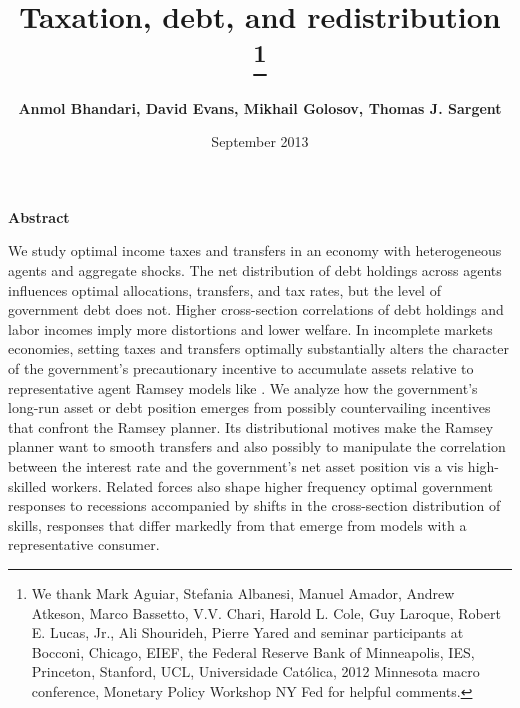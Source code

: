 \documentclass[thmsb,11pt]{article}
\begin{document}
\author{\textbf{Anmol Bhandari, David Evans, Mikhail Golosov, Thomas J. Sargent}%
}
\title{\textbf{Taxation, debt, and redistribution%
\thanks{%
We thank Mark Aguiar, Stefania Albanesi, Manuel Amador,  Andrew Atkeson, Marco Bassetto, V.V. Chari, Harold
L. Cole, Guy Laroque, Robert E. Lucas, Jr., Ali Shourideh, Pierre Yared and seminar
participants at Bocconi, Chicago, EIEF, the Federal Reserve Bank of
Minneapolis, IES, Princeton, Stanford, UCL, Universidade Cat\'{o}lica, 2012
Minnesota macro conference, Monetary Policy Workshop NY Fed for helpful
comments.}}}
\date{September 2013}
\maketitle

\begin{center}
\textbf{Abstract}
\end{center}
We study optimal income taxes and transfers in an economy with heterogeneous agents and aggregate shocks. The net distribution of debt holdings across agents influences optimal allocations, transfers,  and tax rates, but the level of government debt does not. Higher cross-section correlations of debt holdings and labor incomes imply more distortions and lower welfare. In
incomplete markets economies, setting taxes and transfers optimally substantially alters
the character of the government's precautionary incentive to accumulate assets relative
to  representative agent Ramsey models like \citet{Aiyagari2002}. We analyze how the government's long-run asset or debt position emerges from  possibly countervailing incentives that confront the Ramsey planner. Its distributional motives make the Ramsey planner want  to smooth transfers  and also possibly to manipulate the correlation between
the interest rate and the government's net asset position vis a vis high-skilled workers.  Related forces also shape  higher frequency optimal government responses to recessions accompanied
by shifts in the cross-section distribution of skills, responses that differ markedly from that emerge from models with a representative consumer.%


\medskip


%
\end{document}
